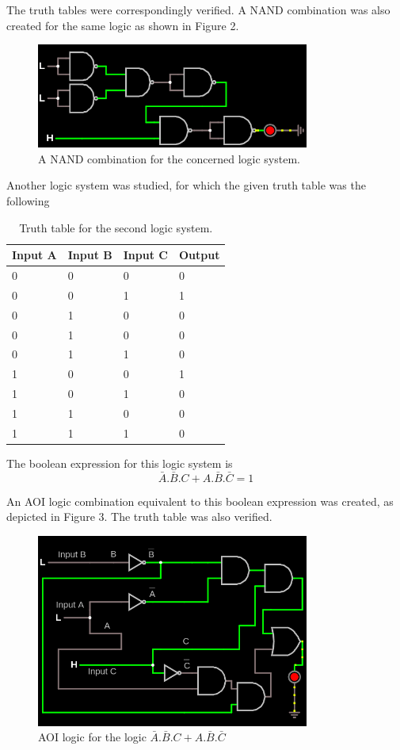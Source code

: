 \documentclass{article}
\begin{document}
	The truth tables were correspondingly verified. A NAND combination was also created for the same logic as shown in Figure 2.
	
	\begin{figure}[H]
		\centering
		\includegraphics[width=0.8\textwidth]{NAND_1.png}
		\caption{A NAND combination for the concerned logic system.}
	\end{figure}

	Another logic system was studied, for which the given truth table was the following
	
	\begin{table}[H]
		\centering
		\begin{tabular}{|l|l|l|l|}
			\hline
			Input A & Input B & Input C & Output\\
			\hline
			0 & 0 & 0 & 0\\
			0 & 0 & 1 & 1\\
			0 &1 &0& 0\\
			0 & 1 & 0 & 0\\
			0 &1 & 1 & 0\\
			1 & 0 & 0 & 1\\
			1 &0 & 1 &0\\
			1 &1 &0 &0\\
			1 &1 &1 &0\\
			\hline
		\end{tabular}
		\caption{Truth table for the second logic system.}
	\end{table}
	
	The boolean expression for this logic system is $$\bar{A}.\bar{B}.C + A.\bar{B}.\bar{C} = 1$$
	
	An AOI logic combination equivalent to this boolean expression was created, as depicted in Figure 3. The truth table was also verified.
	\begin{figure}[H]
		\centering
		\includegraphics[width=0.8\textwidth]{AOI_2}
		\caption{AOI logic for the logic $\bar{A}.\bar{B}.C + A.\bar{B}.\bar{C}$}
	\end{figure}
\end{document}
